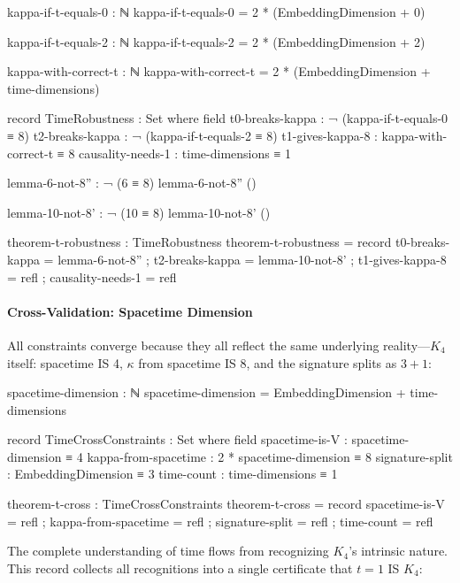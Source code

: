 \documentclass[11pt,a4paper]{book}
\begin{document}
\begin{code}
kappa-if-t-equals-0 : ℕ
kappa-if-t-equals-0 = 2 * (EmbeddingDimension + 0)

kappa-if-t-equals-2 : ℕ
kappa-if-t-equals-2 = 2 * (EmbeddingDimension + 2)

kappa-with-correct-t : ℕ
kappa-with-correct-t = 2 * (EmbeddingDimension + time-dimensions)

record TimeRobustness : Set where
  field
    t0-breaks-kappa   : ¬ (kappa-if-t-equals-0 ≡ 8)
    t2-breaks-kappa   : ¬ (kappa-if-t-equals-2 ≡ 8)
    t1-gives-kappa-8  : kappa-with-correct-t ≡ 8
    causality-needs-1 : time-dimensions ≡ 1

lemma-6-not-8'' : ¬ (6 ≡ 8)
lemma-6-not-8'' ()

lemma-10-not-8' : ¬ (10 ≡ 8)
lemma-10-not-8' ()

theorem-t-robustness : TimeRobustness
theorem-t-robustness = record
  { t0-breaks-kappa   = lemma-6-not-8''
  ; t2-breaks-kappa   = lemma-10-not-8'
  ; t1-gives-kappa-8  = refl
  ; causality-needs-1 = refl
  }
\end{code}

\paragraph{Cross-Validation: Spacetime Dimension}

All constraints converge because they all reflect the same underlying reality—$K_4$ itself: spacetime IS 4, $\kappa$ from spacetime IS 8, and the signature splits as $3 + 1$:

\begin{code}
spacetime-dimension : ℕ
spacetime-dimension = EmbeddingDimension + time-dimensions

record TimeCrossConstraints : Set where
  field
    spacetime-is-V       : spacetime-dimension ≡ 4
    kappa-from-spacetime : 2 * spacetime-dimension ≡ 8
    signature-split      : EmbeddingDimension ≡ 3
    time-count           : time-dimensions ≡ 1

theorem-t-cross : TimeCrossConstraints
theorem-t-cross = record
  { spacetime-is-V       = refl
  ; kappa-from-spacetime = refl
  ; signature-split      = refl
  ; time-count           = refl
  }
\end{code}

The complete understanding of time flows from recognizing $K_4$'s intrinsic nature. This record collects all recognitions into a single certificate that $t = 1$ IS $K_4$:
\end{document}
